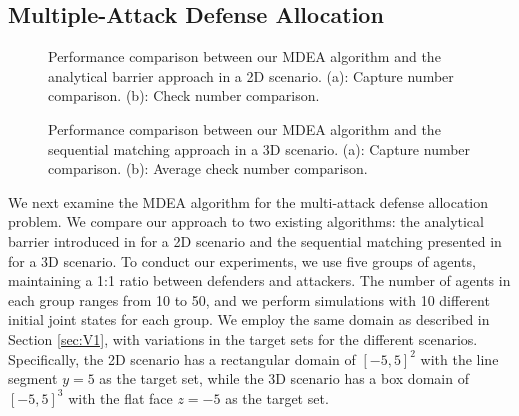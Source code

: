 \documentclass[journal]{IEEEtran}
\newcommand{\1}{\mathbf{1}}
\begin{document}
\subsection{Multiple-Attack Defense Allocation}

\begin{figure}[tp!] 
	\centering
	\caption{\footnotesize Performance comparison between our MDEA algorithm and the analytical barrier approach in a 2D scenario. (a): Capture number comparison. (b): Check number comparison.}
	\label{fig:boxplot_2d}
	\vspace{-5px}
\end{figure}

\begin{figure}[tp!] 
	\centering
	\caption{\footnotesize Performance comparison between our MDEA algorithm and the sequential matching approach in a 3D scenario. (a): Capture number comparison. (b): Average check number comparison.}
	\label{fig:boxplot_3d}
    \vspace{-5px}
\end{figure}

We next examine the MDEA algorithm for the multi-attack defense allocation problem. We compare our approach to two existing algorithms: the analytical barrier introduced in \cite{yan2019task} for a 2D scenario and the sequential matching presented in \cite{yan2022matching} for a 3D scenario. To conduct our experiments, we use five groups of agents, maintaining a 1:1 ratio between defenders and attackers. The number of agents in each group ranges from 10 to 50, and we perform simulations with 10 different initial joint states for each group. We employ the same domain as described in Section \ref{sec:V1}, with variations in the target sets for the different scenarios. Specifically, the 2D scenario has a rectangular domain of $[-5,5]^2$ with the line segment $y=5$ as the target set, while the 3D scenario has a box domain of $[-5,5]^3$ with the flat face $z=-5$ as the target set. 
\end{document}
